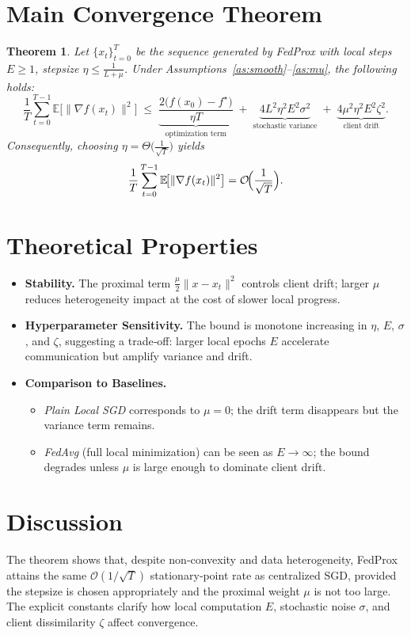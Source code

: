 \documentclass{article}
\newtheorem{theorem}{Theorem}
\newcommand{\EE}{\mathbb{E}}
\begin{document}
\section*{Main Convergence Theorem}
\begin{theorem}\label{thm:main}
Let $\{x_t\}_{t=0}^{T}$ be the sequence generated by FedProx with local steps $E\ge1$, stepsize $\eta\le \frac{1}{L+\mu}$.  
Under Assumptions~\ref{as:smooth}–\ref{as:mu}, the following holds:
\[
\frac1T\sum_{t=0}^{T-1}\EE\!\bigl[\|\nabla f(x_t)\|^2\bigr]
\;\le\;
\underbrace{\frac{2\bigl(f(x_0)-f^\star\bigr)}{\eta T}}_{\text{optimization term}}
\;+\;
\underbrace{4L^2\eta^2 E^2\sigma^2}_{\text{stochastic variance}}
\;+\;
\underbrace{4\mu^2\eta^2 E^2\zeta^2}_{\text{client drift}} .
\]
Consequently, choosing $\eta = \Theta\!\bigl(\frac{1}{\sqrt{T}}\bigr)$ yields
\[
\frac1T\sum_{t=0}^{T-1}\EE\!\bigl[\|\nabla f(x_t)\|^2\bigr]=\mathcal O\!\Bigl(\frac{1}{\sqrt{T}}\Bigr).
\]
\end{theorem}

\section*{Theoretical Properties}
\begin{itemize}[leftmargin=*]
\item \textbf{Stability.} The proximal term $\frac{\mu}{2}\|x-x_t\|^2$ controls client drift; larger $\mu$ reduces heterogeneity impact at the cost of slower local progress.
\item \textbf{Hyperparameter Sensitivity.} The bound is monotone increasing in $\eta$, $E$, $\sigma$, and $\zeta$, suggesting a trade‑off: larger local epochs $E$ accelerate communication but amplify variance and drift.
\item \textbf{Comparison to Baselines.}
    \begin{itemize}
        \item \emph{Plain Local SGD} corresponds to $\mu=0$; the drift term disappears but the variance term remains.
        \item \emph{FedAvg} (full local minimization) can be seen as $E\to\infty$; the bound degrades unless $\mu$ is large enough to dominate client drift.
    \end{itemize}
\end{itemize}

\section*{Discussion}
The theorem shows that, despite non‑convexity and data heterogeneity, FedProx attains the same $\mathcal O(1/\sqrt{T})$ stationary‑point rate as centralized SGD, provided the stepsize is chosen appropriately and the proximal weight $\mu$ is not too large.  The explicit constants clarify how local computation $E$, stochastic noise $\sigma$, and client dissimilarity $\zeta$ affect convergence.
\end{document}

